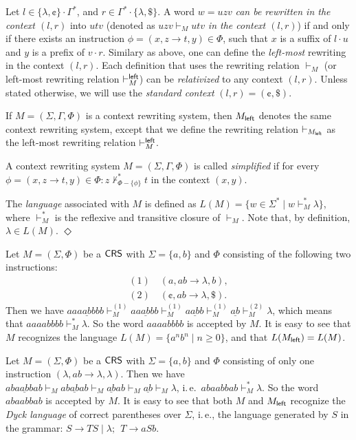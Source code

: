 \begin{definition}
Let $l \in \{\lambda, \cent\} \cdot \Gamma^*$, and $r \in \Gamma^* \cdot \{\lambda, \$\}$. A word $w = uzv$ \emph{can be rewritten in the context $(l, r)$} into $utv$ (denoted as $uzv \vdash_M utv$ \emph{in the context $(l, r)$}) if and only if there exists an instruction $\phi = (x, z \to t, y) \in \Phi$, such that $x$ is a suffix of $l \cdot u$ and $y$ is a prefix of $v \cdot r$. Similary as above, one can define the \emph{left-most} rewriting in the context $(l, r)$. Each definition that uses the rewriting relation $\vdash_M$ (or left-most rewriting relation $\vdash^{\sf left}_M$) can be \emph{relativized} to any context $(l, r)$. Unless stated otherwise, we will use the \emph{standard context} $(l, r) = (\cent, \$)$.

If $M = (\Sigma, \Gamma, \Phi)$ is a context rewriting system, then $M_{\sf left}$ denotes the same context rewriting system, except that we define the rewriting relation $\vdash_{M_{\sf left}}$ as the left-most rewriting relation $\vdash^{\sf left}_M$.

A context rewriting system $M = (\Sigma, \Gamma, \Phi)$ is called \emph{simplified} if for every $\phi = (x, z \to t, y) \in \Phi: z \not\vdash_{\Phi - \{\phi\}}^* t$ in the context $(x, y)$.

The \emph{language} associated with $M$ is defined as $L(M) = \{w \in \Sigma^* \mid w \vdash_M^* \lambda \}$, where $\vdash_M^*$ is the reflexive and transitive closure of $\vdash_M$. Note that, by definition, $\lambda \in L(M)$. \hfill$\Diamond$
\end{definition}

\begin{example}\label{example:a^n_b^n}
Let $M = (\Sigma, \Phi)$ be a $\mbox{\sf CRS\/}$ with $\Sigma = \{a, b\}$ and $\Phi$ consisting of the following two instructions:
$$
\begin{array}{l}
(1) \quad (a, ab \to \lambda, b),\\
(2) \quad (\cent, ab \to \lambda, \$).
\end{array}
$$
Then we have $aaa\underline{ab}bbb \vdash^{(1)}_{M} aa\underline{ab}bb \vdash^{(1)}_{M} a\underline{ab}b \vdash^{(1)}_{M} \underline{ab} \vdash^{(2)}_{M} \lambda$, which means that $aaaabbbb \vdash_{M}^* \lambda$. So the word $aaaabbbb$ is accepted by $M$. It is easy to see that $M$ recognizes the language $L(M) = \{a^n b^n \mid n\ge 0\}$, and that $L(M_{\sf left}) = L(M)$.
\end{example}

\begin{example}\label{example:dyck}
Let $M = (\Sigma, \Phi)$ be a $\mbox{\sf CRS\/}$ with $\Sigma = \{a, b\}$ and $\Phi$ consisting of only one instruction $(\lambda, ab \to \lambda, \lambda)$. Then we have $aba\underline{ab}bab \vdash_M ab\underline{ab}ab \vdash_M \underline{ab}ab \vdash_M \underline{ab} \vdash_M \lambda$, i.\,e.\ $abaabbab \vdash_M^* \lambda$. So the word $abaabbab$ is accepted by $M$. It is easy to see that both $M$ and $M_{\sf left}$ recognize the \emph{Dyck language} of correct parentheses over $\Sigma$, i.\,e., the language generated by $S$ in the grammar: $S \to TS \mid \lambda; \ \ T \to a S b$.
\end{example}

